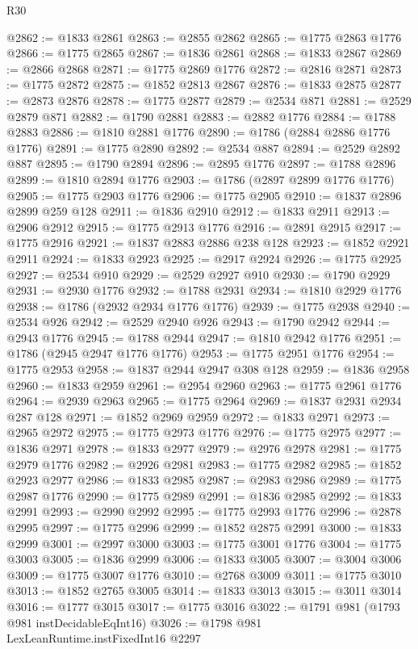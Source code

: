 \begin{lexlean}{R30}
\begin{coremodule}
@2862 := @1833 @2861
@2863 := @2855 @2862
@2865 := @1775 @2863 @1776
@2866 := @1775 @2865
@2867 := @1836 @2861
@2868 := @1833 @2867
@2869 := @2866 @2868
@2871 := @1775 @2869 @1776
@2872 := @2816 @2871
@2873 := @1775 @2872
@2875 := @1852 @2813 @2867
@2876 := @1833 @2875
@2877 := @2873 @2876
@2878 := @1775 @2877
@2879 := @2534 @871
@2881 := @2529 @2879 @871
@2882 := @1790 @2881
@2883 := @2882 @1776
@2884 := @1788 @2883
@2886 := @1810 @2881 @1776
@2890 := @1786 (@2884 @2886 @1776 @1776)
@2891 := @1775 @2890
@2892 := @2534 @887
@2894 := @2529 @2892 @887
@2895 := @1790 @2894
@2896 := @2895 @1776
@2897 := @1788 @2896
@2899 := @1810 @2894 @1776
@2903 := @1786 (@2897 @2899 @1776 @1776)
@2905 := @1775 @2903 @1776
@2906 := @1775 @2905
@2910 := @1837 @2896 @2899 @259 @128
@2911 := @1836 @2910
@2912 := @1833 @2911
@2913 := @2906 @2912
@2915 := @1775 @2913 @1776
@2916 := @2891 @2915
@2917 := @1775 @2916
@2921 := @1837 @2883 @2886 @238 @128
@2923 := @1852 @2921 @2911
@2924 := @1833 @2923
@2925 := @2917 @2924
@2926 := @1775 @2925
@2927 := @2534 @910
@2929 := @2529 @2927 @910
@2930 := @1790 @2929
@2931 := @2930 @1776
@2932 := @1788 @2931
@2934 := @1810 @2929 @1776
@2938 := @1786 (@2932 @2934 @1776 @1776)
@2939 := @1775 @2938
@2940 := @2534 @926
@2942 := @2529 @2940 @926
@2943 := @1790 @2942
@2944 := @2943 @1776
@2945 := @1788 @2944
@2947 := @1810 @2942 @1776
@2951 := @1786 (@2945 @2947 @1776 @1776)
@2953 := @1775 @2951 @1776
@2954 := @1775 @2953
@2958 := @1837 @2944 @2947 @308 @128
@2959 := @1836 @2958
@2960 := @1833 @2959
@2961 := @2954 @2960
@2963 := @1775 @2961 @1776
@2964 := @2939 @2963
@2965 := @1775 @2964
@2969 := @1837 @2931 @2934 @287 @128
@2971 := @1852 @2969 @2959
@2972 := @1833 @2971
@2973 := @2965 @2972
@2975 := @1775 @2973 @1776
@2976 := @1775 @2975
@2977 := @1836 @2971
@2978 := @1833 @2977
@2979 := @2976 @2978
@2981 := @1775 @2979 @1776
@2982 := @2926 @2981
@2983 := @1775 @2982
@2985 := @1852 @2923 @2977
@2986 := @1833 @2985
@2987 := @2983 @2986
@2989 := @1775 @2987 @1776
@2990 := @1775 @2989
@2991 := @1836 @2985
@2992 := @1833 @2991
@2993 := @2990 @2992
@2995 := @1775 @2993 @1776
@2996 := @2878 @2995
@2997 := @1775 @2996
@2999 := @1852 @2875 @2991
@3000 := @1833 @2999
@3001 := @2997 @3000
@3003 := @1775 @3001 @1776
@3004 := @1775 @3003
@3005 := @1836 @2999
@3006 := @1833 @3005
@3007 := @3004 @3006
@3009 := @1775 @3007 @1776
@3010 := @2768 @3009
@3011 := @1775 @3010
@3013 := @1852 @2765 @3005
@3014 := @1833 @3013
@3015 := @3011 @3014
@3016 := @1777 @3015
@3017 := @1775 @3016
@3022 := @1791 @981 (@1793 @981 instDecidableEqInt16)
@3026 := @1798 @981 LexLeanRuntime.instFixedInt16 @2297

\end{coremodule}
\end{lexlean}
